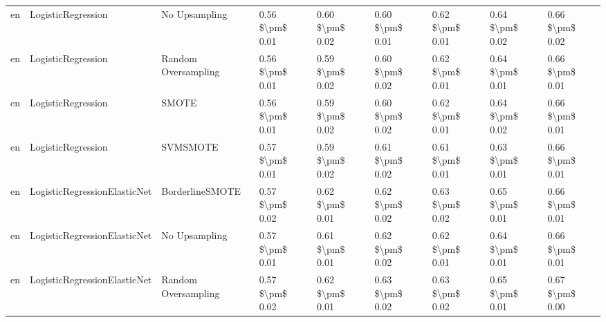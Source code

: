\begin{tabular}{lllllllll}
      en &              LogisticRegression &                 No Upsampling & 0.56 \$\textbackslash pm\$ 0.01 &           0.60 \$\textbackslash pm\$ 0.02 &       0.60 \$\textbackslash pm\$ 0.01 &        0.62 \$\textbackslash pm\$ 0.01 &                         0.64 \$\textbackslash pm\$ 0.02 &     0.66 \$\textbackslash pm\$ 0.02 \\
      en &              LogisticRegression &           Random Oversampling & 0.56 \$\textbackslash pm\$ 0.01 &           0.59 \$\textbackslash pm\$ 0.02 &       0.60 \$\textbackslash pm\$ 0.02 &        0.62 \$\textbackslash pm\$ 0.01 &                         0.64 \$\textbackslash pm\$ 0.01 &     0.66 \$\textbackslash pm\$ 0.01 \\
      en &              LogisticRegression &                         SMOTE & 0.56 \$\textbackslash pm\$ 0.01 &           0.59 \$\textbackslash pm\$ 0.02 &       0.60 \$\textbackslash pm\$ 0.02 &        0.62 \$\textbackslash pm\$ 0.01 &                         0.64 \$\textbackslash pm\$ 0.02 &     0.66 \$\textbackslash pm\$ 0.01 \\
      en &              LogisticRegression &                      SVMSMOTE & 0.57 \$\textbackslash pm\$ 0.01 &           0.59 \$\textbackslash pm\$ 0.02 &       0.61 \$\textbackslash pm\$ 0.02 &        0.61 \$\textbackslash pm\$ 0.01 &                         0.63 \$\textbackslash pm\$ 0.01 &     0.66 \$\textbackslash pm\$ 0.01 \\
      en &    LogisticRegressionElasticNet &               BorderlineSMOTE & 0.57 \$\textbackslash pm\$ 0.02 &           0.62 \$\textbackslash pm\$ 0.01 &       0.62 \$\textbackslash pm\$ 0.02 &        0.63 \$\textbackslash pm\$ 0.02 &                         0.65 \$\textbackslash pm\$ 0.01 &     0.66 \$\textbackslash pm\$ 0.01 \\
      en &    LogisticRegressionElasticNet &                 No Upsampling & 0.57 \$\textbackslash pm\$ 0.01 &           0.61 \$\textbackslash pm\$ 0.01 &       0.62 \$\textbackslash pm\$ 0.02 &        0.62 \$\textbackslash pm\$ 0.01 &                         0.64 \$\textbackslash pm\$ 0.01 &     0.66 \$\textbackslash pm\$ 0.01 \\
      en &    LogisticRegressionElasticNet &           Random Oversampling & 0.57 \$\textbackslash pm\$ 0.02 &           0.62 \$\textbackslash pm\$ 0.01 &       0.63 \$\textbackslash pm\$ 0.02 &        0.63 \$\textbackslash pm\$ 0.02 &                         0.65 \$\textbackslash pm\$ 0.01 &     0.67 \$\textbackslash pm\$ 0.00 \\

\end{tabular}
